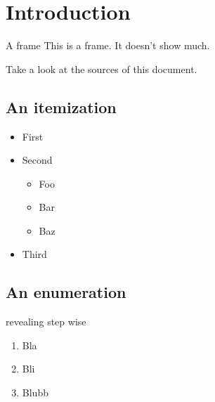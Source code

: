 \section{Introduction}
\begin{frame}{}{A frame}%
  This is a frame. It doesn't show much.

  Take a look at the sources of this document.
\end{frame}%
\subsection{An itemization}
\begin{frame}{}{}%
  \begin{itemize}
    \item First
    \item Second
      \begin{itemize}
        \item Foo
        \item Bar
        \item Baz
      \end{itemize}
    \item Third
  \end{itemize}
\end{frame}%
\subsection{An enumeration}
\begin{frame}{}{revealing step wise}%
  \begin{enumerate}[<+->]
    \item Bla
    \item Bli
    \item Blubb
  \end{enumerate}
\end{frame}%

